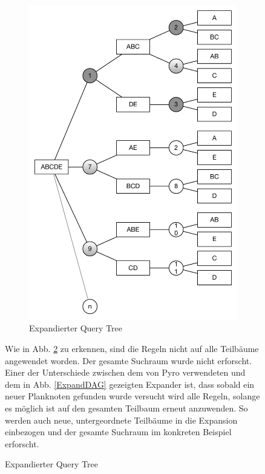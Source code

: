 \begin{figure}[h]
\begin{figure}[ht]
  \centering
  \includegraphics[scale=0.75]{05_ResultsEvaluation/00_media/PyroResult.pdf}
  \caption{Expandierter Query Tree}
  \label{ExpandedQueryTree}
\end{figure}

Wie in Abb. \ref{ExpandedQueryTree} zu erkennen, sind die Regeln nicht auf alle Teilbäume angewendet worden. Der gesamte Suchraum wurde nicht erforscht. Einer der Unterschiede zwischen dem von Pyro verwendeten und dem in Abb. \ref{ExpandDAG} gezeigten Expander ist, dass sobald ein neuer Planknoten gefunden wurde versucht wird alle Regeln, solange es möglich ist auf den gesamten Teilbaum erneut anzuwenden. So werden auch neue, untergeordnete Teilbäume in die Expansion einbezogen und der gesamte Suchraum im konkreten Beispiel erforscht.



\end{figure}
